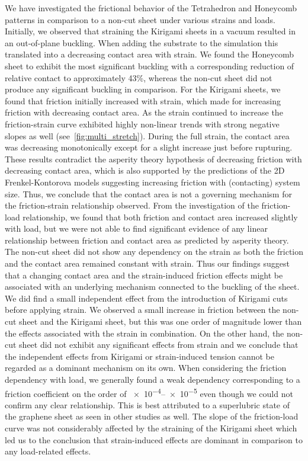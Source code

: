
We have investigated the frictional behavior of the Tetrahedron and Honeycomb
patterns in comparison to a non-cut sheet under various strains and loads.
Initially, we observed that straining the Kirigami sheets in a vacuum resulted
in an out-of-plane buckling. When adding the substrate to the simulation this
translated into a decreasing contact area with strain. We found the Honeycomb
sheet to exhibit the most significant buckling with a corresponding reduction of
relative contact to approximately 43\%, whereas the non-cut sheet did not
produce any significant buckling in comparison. For the Kirigami sheets, we
found that friction initially increased with strain, which made for increasing
friction with decreasing contact area. As the strain continued to increase the
friction-strain curve exhibited highly non-linear trends with strong negative
slopes as well (see~\cref{fig:multi_stretch}). During the full strain, the
contact area was decreasing monotonically except for a slight increase just
before rupturing. These results contradict the asperity theory hypothesis of
decreasing friction with decreasing contact area, which is also supported by the predictions of the 2D Frenkel-Kontorova models suggesting increasing friction with (contacting) system size. Thus, we conclude that the contact area is not a governing mechanism for the friction-strain relationship observed. From the investigation of the friction-load relationship, we found that both friction and contact area increased slightly with load, but we were not able to find significant evidence of any linear relationship between friction and contact area as predicted by asperity theory. The non-cut sheet
did not show any dependency on the strain as both the friction and
the contact area remained constant with strain. Thus our findings suggest that a
changing contact area and the strain-induced friction effects might be
associated with an underlying mechanism connected to the buckling of the
sheet. We did find a small independent effect from the introduction of Kirigami
cuts before applying strain. We observed a small increase in friction between
the non-cut sheet and the Kirigami sheet, but this was one order of magnitude
lower than the effects associated with the strain in combination. On the other hand, the non-cut sheet did not exhibit any significant effects from strain and we conclude that the independent effects from Kirigami or strain-induced tension cannot be regarded as a dominant mechanism on its own. When
considering the friction dependency with load, we generally found a weak
dependency corresponding to a friction coefficient on the order of
\num{e-4}--\num{e-5} even though we could not confirm any clear relationship.
This is best attributed to a superlubric state of the graphene sheet as seen in
other studies as well. The slope of the friction-load curve was not considerably
affected by the straining of the Kirigami sheet which led us to the conclusion
that strain-induced effects are dominant in comparison to any load-related
effects. 

